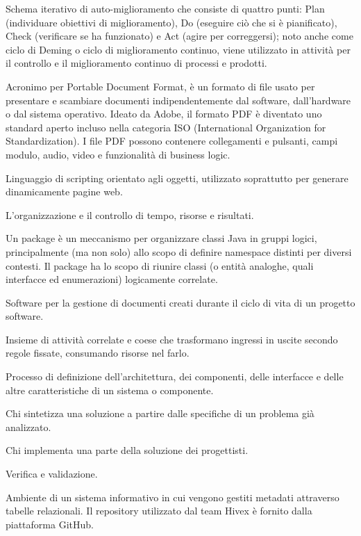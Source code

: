\item[PDCA, schema] Schema iterativo di auto-miglioramento che consiste di quattro punti: Plan (individuare obiettivi di miglioramento), Do (eseguire ciò che si è pianificato), Check (verificare se ha funzionato) e Act (agire per correggersi); noto anche come ciclo di Deming o ciclo di miglioramento continuo, viene utilizzato in attività per il controllo e il miglioramento continuo di processi e prodotti.
\item[PDF] Acronimo per Portable Document Format, è un formato di file usato per presentare e scambiare documenti indipendentemente dal software, dall'hardware o dal sistema operativo. Ideato da Adobe, il formato PDF è diventato uno standard aperto incluso nella categoria ISO (International Organization for Standardization). I file PDF possono contenere collegamenti e pulsanti, campi modulo, audio, video e funzionalità di business logic.
\item[PHP] Linguaggio di scripting orientato agli oggetti, utilizzato soprattutto per generare dinamicamente pagine web.
\item[Pianificazione] L'organizzazione e il controllo di tempo, risorse e risultati.
\item[Package] Un package è un meccanismo per organizzare classi Java in gruppi logici, principalmente (ma non solo) allo scopo di definire namespace distinti per diversi contesti. Il package ha lo scopo di riunire classi (o entità analoghe, quali interfacce ed enumerazioni) logicamente correlate.
\item[PragmaDB] Software per la gestione di documenti creati durante il ciclo di vita di un progetto software.
\item[Processo (software)] Insieme di attività correlate e coese che trasformano ingressi in uscite secondo regole fissate, consumando risorse nel farlo.
\item[Progettazione] Processo di definizione dell'architettura, dei componenti, delle interfacce e delle altre caratteristiche di un sistema o componente.
\item[Progettista] Chi sintetizza una soluzione a partire dalle specifiche di un problema già analizzato.
\item[Programmatore] Chi implementa una parte della soluzione dei progettisti.
\item[qualifica] Verifica e validazione.
\item[Repository] Ambiente di un sistema informativo in cui vengono gestiti metadati attraverso tabelle relazionali. Il repository utilizzato dal team Hivex è fornito dalla piattaforma GitHub.
